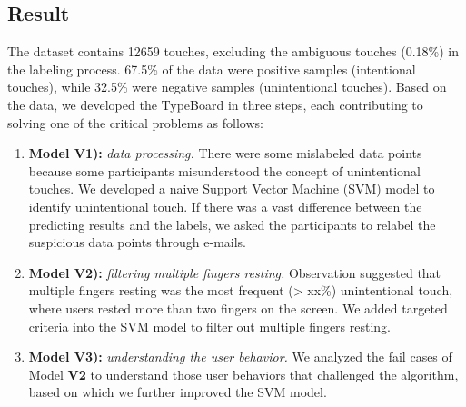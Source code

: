 
\subsection{Result}

The dataset contains 12659 touches, excluding the ambiguous touches (0.18\%) in the labeling process. 67.5\% of the data were positive samples (intentional touches), while 32.5\% were negative samples (unintentional touches). Based on the data, we developed the TypeBoard in three steps, each contributing to solving one of the critical problems as follows:

\begin{enumerate}
	\item{\textbf{Model V1):} \emph{data processing.} There were some mislabeled data points because some participants misunderstood the concept of unintentional touches. We developed a naive Support Vector Machine (SVM) model to identify unintentional touch. If there was a vast difference between the predicting results and the labels, we asked the participants to relabel the suspicious data points through e-mails.}
	\item{\textbf{Model V2):} \emph{filtering multiple fingers resting.} Observation suggested that multiple fingers resting was the most frequent (> xx\%) unintentional touch, where users rested more than two fingers on the screen. We added targeted criteria into the SVM model to filter out multiple fingers resting.}
	\item{\textbf{Model V3):} \emph{understanding the user behavior.} We analyzed the fail cases of Model \textbf{V2} to understand those user behaviors that challenged the algorithm, based on which we further improved the SVM model.}
\end{enumerate}

